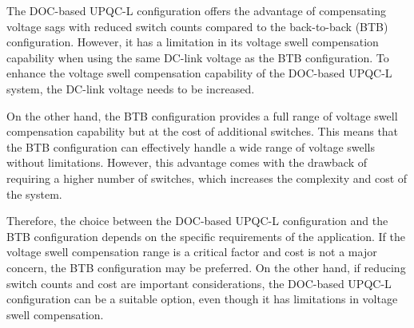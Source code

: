 The DOC-based UPQC-L configuration offers the advantage of compensating voltage sags with reduced switch counts compared to the back-to-back (BTB) configuration. However, it has a limitation in its voltage swell compensation capability when using the same DC-link voltage as the BTB configuration. To enhance the voltage swell compensation capability of the DOC-based UPQC-L system, the DC-link voltage needs to be increased.

On the other hand, the BTB configuration provides a full range of voltage swell compensation capability but at the cost of additional switches. This means that the BTB configuration can effectively handle a wide range of voltage swells without limitations. However, this advantage comes with the drawback of requiring a higher number of switches, which increases the complexity and cost of the system.

Therefore, the choice between the DOC-based UPQC-L configuration and the BTB configuration depends on the specific requirements of the application. If the voltage swell compensation range is a critical factor and cost is not a major concern, the BTB configuration may be preferred. On the other hand, if reducing switch counts and cost are important considerations, the DOC-based UPQC-L configuration can be a suitable option, even though it has limitations in voltage swell compensation.

